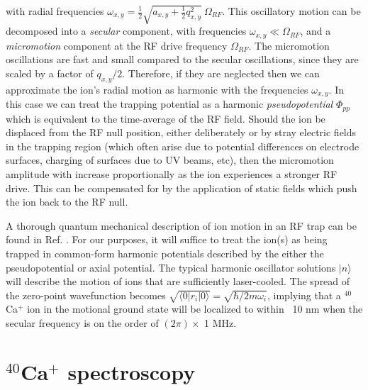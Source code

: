 with radial frequencies $\omega_{x,y} = \frac{1}{2} \sqrt{a_{x,y} + \frac{1}{2} q_{x,y}^2} \ \Omega_{RF}$. This oscillatory motion can be decomposed into a \textit{secular} component, with frequencies $\omega_{x,y} \ll \Omega_{RF}$, and a \textit{micromotion} component at the RF drive frequency $\Omega_{RF}$. The micromotion oscillations are fast and small compared to the secular oscillations, since they are scaled by a factor of $q_{x,y}/2$. Therefore, if they are neglected then we can approximate the ion's radial motion as harmonic with the frequencies $\omega_{x,y}$. In this case we can treat the trapping potential as a harmonic \textit{pseudopotential} $\Phi_{pp}$ which is equivalent to the time-average of the RF field. Should the ion be displaced from the RF null position, either deliberately or by stray electric fields in the trapping region (which often arise due to potential differences on electrode surfaces, charging of surfaces due to UV beams, etc), then the micromotion amplitude with increase proportionally as the ion experiences a stronger RF drive. This can be compensated for by the application of static fields which push the ion back to the RF null. 

A thorough quantum mechanical description of ion motion in an RF trap can be found in Ref. \cite{Leibfried03.RMP.75.281}. For our purposes, it will suffice to treat the ion(s) as being trapped in common-form harmonic potentials described by the either the pseudopotential or axial potential. The typical harmonic oscillator solutions $|n\rangle$ will describe the motion of ions that are sufficiently laser-cooled. The spread of the zero-point wavefunction becomes $\sqrt{\langle 0 | r_i | 0 \rangle} = \sqrt{\hbar / 2 m \omega_i}$, implying that a $^{40}$Ca$^+$ ion in the motional ground state will be localized to within ~10 nm when the secular frequency is on the order of $(2 \pi) \times$ 1 MHz.





\section{$^{40}$Ca$^+$ spectroscopy}


